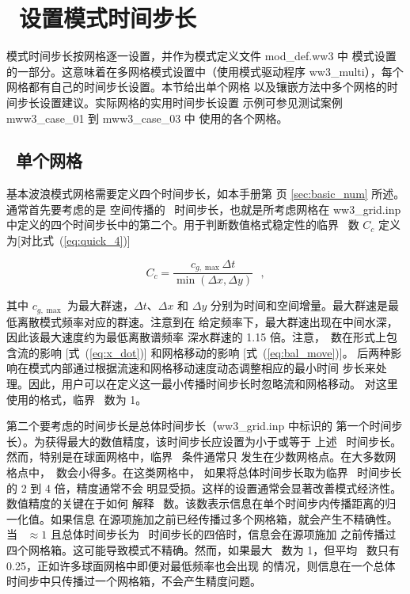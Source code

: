 \pagestyle{myheadings} \setcounter{page}{1} \setcounter{footnote}{0}

\section{~设置模式时间步长} \label{app:tstep}
\newcounters
\vssub

模式时间步长按网格逐一设置，并作为模式定义文件 {\file mod\_def.ww3} 中
模式设置的一部分。这意味着在多网格模式设置中（使用模式驱动程序
{\file ww3\_multi}），每个网格都有自己的时间步长设置。本节给出单个网格
以及镶嵌方法中多个网格的时间步长设置建议。实际网格的实用时间步长设置
示例可参见测试案例 {\file mww3\_case\_01} 到 {\file mww3\_case\_03} 中
使用的各个网格。

\subsection{~单个网格}

基本波浪模式网格需要定义四个时间步长，如本手册第
\pageref{dt_list} 页 \para\ref{sec:basic_num} 所述。通常首先要考虑的是
空间传播的 \cfl\ 时间步长，也就是所考虑网格在 {\file ww3\_grid.inp}
中定义的四个时间步长中的第二个。用于判断数值格式稳定性的临界 \cfl\
数 $C_c$ 定义为[对比式~(\ref{eq:quick_4})]

\begin{equation}
C_c = \frac{c_{g,\max} \Delta t}{\min(\Delta x , \Delta y)} \:\:\: ,
\label{eq:CFLmax}
\end{equation}

\noindent
其中 $c_{g,\max}$ 为最大群速，$\Delta t$、$\Delta x$ 和 $\Delta y$
分别为时间和空间增量。最大群速是最低离散模式频率对应的群速。注意到在
给定频率下，最大群速出现在中间水深，因此该最大速度约为最低离散谱频率
深水群速的 1.15 倍。注意，\cfl\ 数在形式上包含流的影响
[式~(\ref{eq:x_dot})] 和网格移动的影响 [式~(\ref{eq:bal_move})]。
后两种影响在模式内部通过根据流速和网格移动速度动态调整相应的最小时间
步长来处理。因此，用户可以在定义这一最小传播时间步长时忽略流和网格移动。
对这里使用的格式，临界 \cfl\ 数为 1。

第二个要考虑的时间步长是总体时间步长（{\file ww3\_grid.inp} 中标识的
第一个时间步长）。为获得最大的数值精度，该时间步长应设置为小于或等于
上述 \cfl\ 时间步长。然而，特别是在球面网格中，临界 \cfl\ 条件通常只
发生在少数网格点。在大多数网格点中，\cfl\ 数会小得多。在这类网格中，
如果将总体时间步长取为临界 \cfl\ 时间步长的 2 到 4 倍，精度通常不会
明显受损。这样的设置通常会显著改善模式经济性。数值精度的关键在于如何
解释 \cfl\ 数。该数表示信息在单个时间步内传播距离的归一化值。如果信息
在源项施加之前已经传播过多个网格箱，就会产生不精确性。当 \cfl\
$\approx 1$ 且总体时间步长为 \cfl\ 时间步长的四倍时，信息会在源项施加
之前传播过四个网格箱。这可能导致模式不精确。然而，如果最大 \cfl\ 数为
1，但平均 \cfl\ 数只有 0.25，正如许多球面网格中即便对最低频率也会出现
的情况，则信息在一个总体时间步中只传播过一个网格箱，不会产生精度问题。

